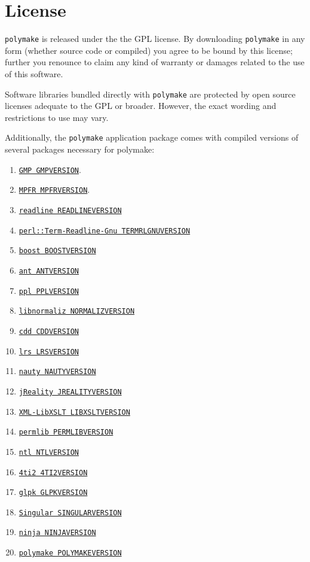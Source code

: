 \documentclass[a4paper]{amsart}
\newcommand{\polymake}{\texttt{polymake}\xspace}
\begin{document}
\section*{License}

\polymake is released under the the GPL license. By downloading \polymake in any form (whether source code or compiled) you agree to be bound by this license; further you renounce to claim any kind of warranty or damages related to the use of this software.

Software libraries bundled directly with \polymake are protected by open source licenses adequate to the GPL or broader. However, the exact wording and restrictions to use may vary. 

Additionally, the \polymake application package comes with compiled versions of several packages necessary for polymake: 
\begin{enumerate}
\item \href{GMPHOME}{\texttt{GMP GMPVERSION}}.
\item \href{MPFRHOME}{\texttt{MPFR MPFRVERSION}}.
\item \href{READLINEHOME}{\texttt{readline READLINEVERSION}}
\item \href{TERMRLGNUHOME}{\texttt{perl::Term-Readline-Gnu TERMRLGNUVERSION}}
\item \href{BOOSTHOME}{\texttt{boost BOOSTVERSION}}
\item \href{ANTHOME}{\texttt{ant ANTVERSION}}
\item \href{PPLHOME}{\texttt{ppl PPLVERSION}}
\item \href{NORMALIZHOME}{\texttt{libnormaliz NORMALIZVERSION}}
\item \href{CDDHOME}{\texttt{cdd CDDVERSION}}
\item \href{LRSHOME}{\texttt{lrs LRSVERSION}}
\item \href{NAUTYHOME}{\texttt{nauty NAUTYVERSION}}
\item \href{JREALITYHOME}{\texttt{jReality JREALITYVERSION}}
\item \href{LIBXSLTHOME}{\texttt{XML-LibXSLT LIBXSLTVERSION}}
\item \href{PERMLIBHOME}{\texttt{permlib PERMLIBVERSION}}
\item \href{NTLHOME}{\texttt{ntl NTLVERSION}}
\item \href{4TI2HOME}{\texttt{4ti2 4TI2VERSION}}
\item \href{GLPKHOME}{\texttt{glpk GLPKVERSION}}
\item \href{SINGULARHOME}{\texttt{Singular SINGULARVERSION}}
\item \href{NINJAHOME}{\texttt{ninja NINJAVERSION}}
\item \href{POLYMAKEHOME}{\texttt{polymake POLYMAKEVERSION}}
\end{enumerate}
\end{document}
